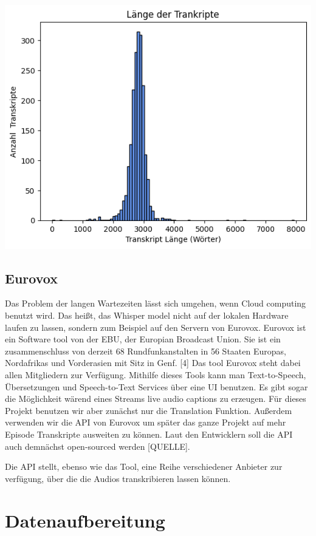 \includegraphics[width=\linewidth]{figures/transcript_length.png}


\subsection{Eurovox}

Das Problem der langen Wartezeiten lässt sich umgehen, wenn Cloud computing benutzt wird.
Das heißt, das Whisper model nicht auf der lokalen Hardware laufen zu lassen, sondern zum Beispiel auf den Servern von Eurovox. 
Eurovox ist ein Software tool von der EBU, der Europian Broadcast Union. 
Sie ist ein zusammenschluss von derzeit 68 Rundfunkanstalten in 56 Staaten Europas, Nordafrikas und Vorderasien mit Sitz in Genf. [4] 
Das tool Eurovox steht dabei allen Mitgliedern zur Verfügung.  
Mithilfe dieses Tools kann man Text-to-Speech, Übersetzungen und Speech-to-Text Services über eine UI benutzen. 
Es gibt sogar die Möglichkeit wärend eines Streams live audio captions zu erzeugen. 
Für dieses Projekt benutzen wir aber zunächst nur die Translation Funktion. 
Außerdem verwenden wir die API von Eurovox um später das ganze Projekt auf mehr Episode Transkripte ausweiten zu können. 
Laut den Entwicklern soll die API auch demnächst open-sourced werden [QUELLE].

Die API stellt, ebenso wie das Tool, eine Reihe verschiedener Anbieter zur verfügung, über die die Audios transkribieren lassen können. 

\section{Datenaufbereitung}

